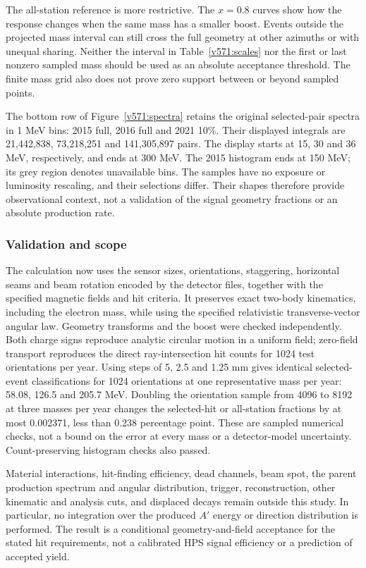 The all-station reference is more restrictive. The $x=0.8$ curves show how
the response changes when the same mass has a smaller boost.
Events outside the projected mass interval can still cross the full geometry
at other azimuths or with unequal sharing. Neither the interval in
Table~\ref{v571:scales} nor the first or last nonzero sampled mass should be
used as an absolute acceptance threshold. The finite mass grid also does not
prove zero support between or beyond sampled points.

The bottom row of Figure~\ref{v571:spectra} retains the original selected-pair spectra in 1 MeV bins:
2015 full, 2016 full and 2021 10\%. Their displayed integrals are 21,442,838,
73,218,251 and 141,305,897 pairs. The display starts at 15, 30 and 36 MeV,
respectively, and ends at 300 MeV. The 2015 histogram ends at 150 MeV; its grey
region denotes unavailable bins. The samples have no exposure or luminosity
rescaling, and their selections differ. Their shapes therefore provide
observational context, not a validation of the signal geometry fractions or
an absolute production rate.

\subsubsection{Validation and scope}
The calculation now uses the sensor sizes, orientations, staggering,
horizontal seams and beam rotation encoded by the detector files, together
with the specified magnetic fields and hit criteria. It preserves
exact two-body kinematics, including the electron mass, while using the
specified relativistic transverse-vector angular law. Geometry transforms and
the boost were checked independently. Both charge signs reproduce analytic
circular motion in a uniform field; zero-field transport reproduces the
direct ray-intersection hit counts for 1024 test orientations per year.
Using steps of 5, 2.5 and 1.25 mm gives identical selected-event classifications
for 1024 orientations at one representative mass per year: 58.08, 126.5 and
205.7 MeV. Doubling the orientation sample from 4096 to 8192 at three masses
per year changes the selected-hit or all-station fractions by at most
0.002371, less than 0.238 percentage point. These are sampled numerical
checks, not a bound on the error at every mass or a detector-model uncertainty.
Count-preserving histogram checks also passed.

Material interactions, hit-finding efficiency, dead channels, beam spot,
the parent production spectrum and angular distribution, trigger,
reconstruction, other kinematic and analysis cuts, and displaced decays
remain outside this study. In particular, no integration over the produced
$A'$ energy or direction distribution is performed. The result is a
conditional geometry-and-field acceptance for the stated hit requirements,
not a calibrated HPS signal efficiency or a prediction of accepted yield.



